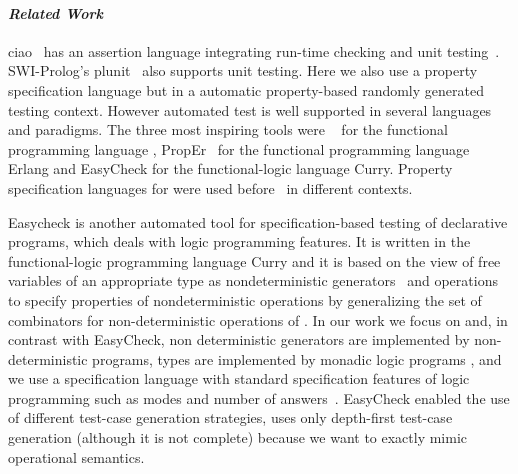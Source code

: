 
\paragraph{\bfseries \em Related Work} 
\label{sec:rel-work}


%
{\sf ciao}~\cite{ciao-prolog} has an assertion language
integrating run-time checking and unit testing~\cite{ciao-assert-unit}.
%
{\sf SWI-Prolog}'s {\sf plunit}~\cite{swi-prolog} also supports unit testing.
%
Here we also use a property specification language but in a
automatic property-based randomly generated testing context.
%
However automated test is well supported in several languages and paradigms. 
%
The three most inspiring tools were \QuickCheck~\cite{quickcheck} for the
functional programming language \Haskell, {\sf PropEr}~\cite{papadakis2011proper} for the
functional programming language {\sf Erlang}
and {\sf EasyCheck} \cite{christiansen2008easycheck}  for
the functional-logic language {\sf Curry}.
%
Property specification languages for \Prolog{} were used
before~\cite{ciao-assert-unit,Deville1990logprog,somogyi1995mercury} in
different contexts.

{\sf Easycheck} is another automated tool for specification-based testing of
declarative programs, which deals with logic programming features.
%
It is written in the functional-logic programming language Curry and it
is based on the view of free variables of an appropriate type as
nondeterministic generators~\cite{antoy2006overlapping} and operations to specify properties of
nondeterministic operations by generalizing the set of combinators for
non-deterministic operations of \QuickCheck{}.
%
In our work we focus on \Prolog{} and, in contrast with {\sf EasyCheck}, non
deterministic generators are implemented by non-deterministic \Prolog{}
programs, types are implemented by monadic logic programs \cite{fruhwirth1991logic,florido1992types}, and
we use a specification language with standard specification features of
logic programming such as modes and number of answers~\cite{Deville1990logprog}.
{\sf EasyCheck} enabled the use of different test-case generation strategies,
\plqc{} uses only depth-first test-case generation (although it is
not complete) because we want to exactly mimic \Prolog{} operational
semantics.


